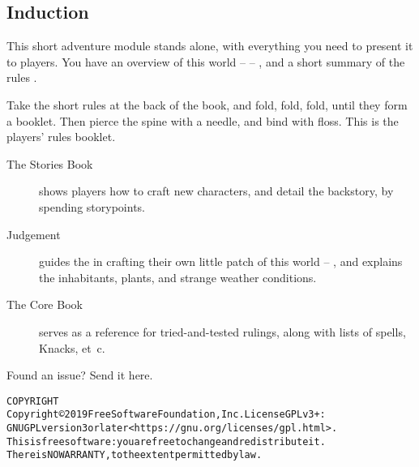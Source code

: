 \subsection*{Induction}

\begin{multicols}{2}
\noindent
This short adventure module stands alone, with everything you need to present it to players.
You have an overview of this world --  -- , and a short summary of the rules .

Take the short rules at the back of the book, and fold, fold, fold, until they form a booklet.
Then pierce the spine with a needle, and bind with floss.
This is the players' rules booklet.

\begin{description}
  \item[The Stories Book]
  shows players how to craft new characters, and detail the backstory, by spending \glspl{storypoint}.
  \item[Judgement]
  guides the  in crafting their own little patch of this world -- , and explains the inhabitants, plants, and strange weather conditions.
  \item[The Core Book]
  serves as a reference for tried-and-tested rulings, along with lists of spells, Knacks, et~c.
\end{description}

\begin{center}
  
  Found an issue?
  Send it here.
\end{center}

\end{multicols}

\begin{alltt}
COPYRIGHT
       Copyright \copyright 2019 Free Software Foundation, Inc.  License GPLv3+:
  GNU GPL version 3 or later <https://gnu.org/licenses/gpl.html>.
       This is free software: you are free to change and redistribute it.
  There is NO WARRANTY, to the extent permitted by law.

\end{alltt}
